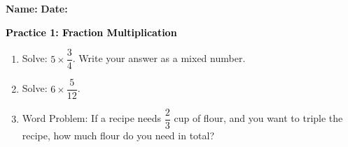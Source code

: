 \documentclass[12pt, letterpaper, fleqn]{article}
\begin{document}
\textbf{Name:} \underline{\hspace{5cm}}
\hfill
\textbf{Date:} \underline{\hspace{3cm}}\\

\begin{tcolorbox}[colback=customteal!20]
    \large\textcolor{black}{\textbf{Practice 1: Fraction Multiplication}}
\end{tcolorbox}
\begin{enumerate}[itemsep=3.5cm, leftmargin=0.6cm]
\item Solve: $5 \times \dfrac{3}{4}$. Write your answer as a mixed number.
\vspace{3.5cm}
\item Solve: $6 \times \dfrac{5}{12}$.
\vspace{3.5cm}
\item Word Problem: If a recipe needs $\dfrac{2}{3}$ cup of flour, and you want to triple the recipe, how much flour do you need in total?
\end{enumerate}
\end{document}
